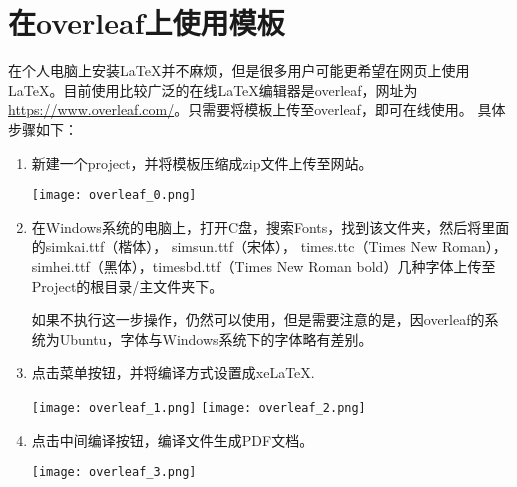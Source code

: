 
\section{在overleaf上使用模板}
在个人电脑上安装\LaTeX 并不麻烦，但是很多用户可能更希望在网页上使用\LaTeX 。目前使用比较广泛的在线LaTeX编辑器是overleaf，网址为\url{https://www.overleaf.com/}。只需要将模板上传至overleaf，即可在线使用。
具体步骤如下：

\begin{enumerate}
    \item 新建一个project，并将模板压缩成zip文件上传至网站。
    \begin{center}
        \texttt{[image: overleaf\_0.png]}
    \end{center}

    \item 在Windows系统的电脑上，打开C盘，搜索Fonts，找到该文件夹，然后将里面的simkai.ttf（楷体）， simsun.ttf（宋体）， times.ttc（Times New Roman）， simhei.ttf（黑体），timesbd.ttf（Times New Roman bold）几种字体上传至Project的根目录/主文件夹下。

    如果不执行这一步操作，仍然可以使用，但是需要注意的是，因overleaf的系统为Ubuntu，字体与Windows系统下的字体略有差别。
    
    \item 点击菜单按钮，并将编译方式设置成xeLaTeX.
    \begin{center}
        \texttt{[image: overleaf\_1.png]}
        \texttt{[image: overleaf\_2.png]}
    \end{center}
    \item 点击中间编译按钮，编译文件生成PDF文档。
    \begin{center}
        \texttt{[image: overleaf\_3.png]}
    \end{center}
\end{enumerate}

